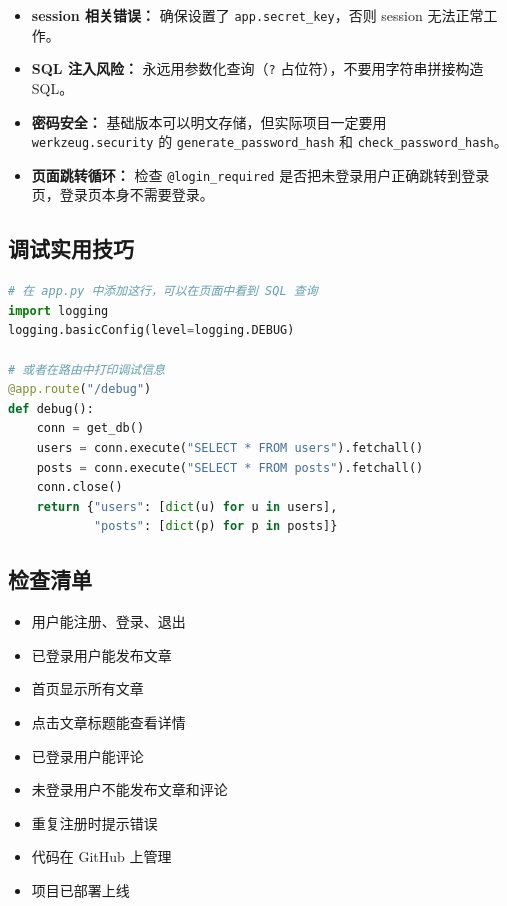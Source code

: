 \documentclass[a4paper,12pt]{ctexart}
\begin{document}
\begin{itemize}
  \item \textbf{session 相关错误：} 确保设置了 \texttt{app.secret\_key}，否则 session 无法正常工作。
  \item \textbf{SQL 注入风险：} 永远用参数化查询（\texttt{?} 占位符），不要用字符串拼接构造 SQL。
  \item \textbf{密码安全：} 基础版本可以明文存储，但实际项目一定要用 \texttt{werkzeug.security} 的 \texttt{generate\_password\_hash} 和 \texttt{check\_password\_hash}。
  \item \textbf{页面跳转循环：} 检查 \texttt{@login\_required} 是否把未登录用户正确跳转到登录页，登录页本身不需要登录。
\end{itemize}

\subsection*{调试实用技巧}

\begin{lstlisting}[language=Python]
# 在 app.py 中添加这行，可以在页面中看到 SQL 查询
import logging
logging.basicConfig(level=logging.DEBUG)

# 或者在路由中打印调试信息
@app.route("/debug")
def debug():
    conn = get_db()
    users = conn.execute("SELECT * FROM users").fetchall()
    posts = conn.execute("SELECT * FROM posts").fetchall()
    conn.close()
    return {"users": [dict(u) for u in users],
            "posts": [dict(p) for p in posts]}
\end{lstlisting}

\subsection*{检查清单}

\begin{itemize}
  \item 用户能注册、登录、退出
  \item 已登录用户能发布文章
  \item 首页显示所有文章
  \item 点击文章标题能查看详情
  \item 已登录用户能评论
  \item 未登录用户不能发布文章和评论
  \item 重复注册时提示错误
  \item 代码在 GitHub 上管理
  \item 项目已部署上线
\end{itemize}
\end{document}

